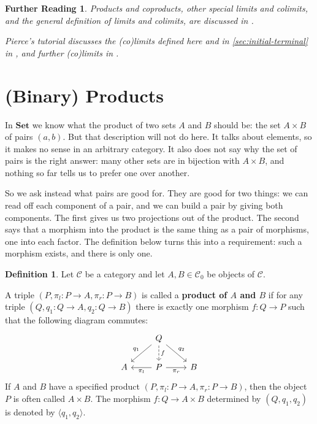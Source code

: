\documentclass[a4paper,11pt, oneside,titlepage=false]{scrbook}
\theoremstyle{plain}
\newtheorem*{reading*}{Further Reading}
\theoremstyle{definition}
\newtheorem{dfn}[thm]{Definition}
\newcommand{\Cat}[1]{\mathcal{#1}}
\newcommand{\CC}{\Cat{C}}
\newcommand{\Catb}[1]{\mathbf{#1}}
\newcommand{\SET}{\Catb{Set}}
\newcommand{\Ob}[1]{{#1}_0}
\newcommand{\projl}{\ensuremath{\pi_l}}
\newcommand{\projr}{\ensuremath{\pi_r}}
\newcommand{\intoproduct}[2]{\ensuremath{\langle #1, #2 \rangle}}
\begin{document}
\begin{reading*}
  Products and coproducts, other special limits and colimits, and the general
  definition of limits and colimits, are discussed in \cite[\S\S 5.1, 5.2]{leinster}.

  Pierce's tutorial discusses the (co)limits defined here and in
  \cref{sec:initial-terminal} in \cite[\S\S 2.3--2.4]{pierce}, and further
  (co)limits in \cite[\S\S 2.5--2.7]{pierce}.
\end{reading*}

\section{(Binary) Products}
\label{sec:products}

In $\SET$ we know what the product of two sets $A$ and $B$ should be: the set
$A \times B$ of pairs $(a,b)$.
But that description will not do here.
It talks about elements, so it makes no sense in an arbitrary category.
It also does not say why the set of pairs is the right answer: many other sets
are in bijection with $A \times B$, and nothing so far tells us to prefer one
over another.

So we ask instead what pairs are good for.
They are good for two things: we can read off each component of a pair, and we
can build a pair by giving both components.
The first gives us two projections out of the product.
The second says that a morphism into the product is the same thing as a pair of
morphisms, one into each factor.
The definition below turns this into a requirement: such a morphism exists, and
there is only one.

\begin{dfn}\label{def:binproduct}
  Let $\CC$ be a category and let $A,B \in \Ob\CC$ be objects of $\CC$.

  A triple $(P,\projl : P \to A ,\projr : P \to B)$ is called a \textbf{product of $A$ and $B$} if for any triple $(Q,q_1 : Q \to A, q_2 : Q \to B)$ there is exactly one morphism $f : Q \to P$ such that the following diagram commutes:
  \[
    \begin{tikzcd}
      &
      Q \ar[ld, "q_1"'] \ar[rd, "q_2"] \ar[d, dashed, "f"]
      &
      \\
      A
      &
      P \ar[l, "\projl"] \ar[r, "\projr"']
      &
      B
    \end{tikzcd}
  \]
  If $A$ and $B$ have a specified product $(P,\projl : P \to A ,\projr : P \to B)$, then the object $P$ is often called $A \times B$.
  The morphism $f : Q \to A \times B$ determined by $(Q, q_1, q_2)$ is denoted by $\intoproduct { q_1} {q_2}$.
\end{dfn}
\end{document}
